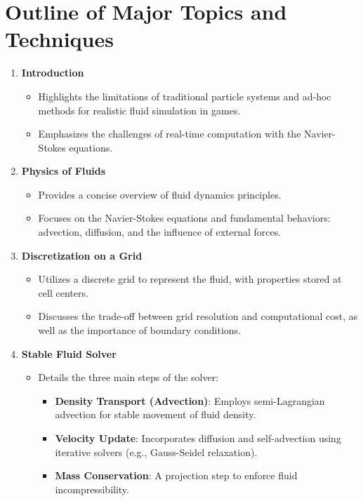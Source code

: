 \documentclass[12pt]{article}
\begin{document}
\section{Outline of Major Topics and Techniques}
\begin{enumerate}[noitemsep]
    \item \textbf{Introduction}
    \begin{itemize}[noitemsep]
        \item Highlights the limitations of traditional particle systems and ad-hoc methods for realistic fluid simulation in games.
        \item Emphasizes the challenges of real-time computation with the Navier-Stokes equations.
    \end{itemize}
    \item \textbf{Physics of Fluids}
    \begin{itemize}[noitemsep]
        \item Provides a concise overview of fluid dynamics principles.
        \item Focuses on the Navier-Stokes equations and fundamental behaviors: advection, diffusion, and the influence of external forces.
    \end{itemize}
    \item \textbf{Discretization on a Grid}
    \begin{itemize}[noitemsep]
        \item Utilizes a discrete grid to represent the fluid, with properties stored at cell centers.
        \item Discusses the trade-off between grid resolution and computational cost, as well as the importance of boundary conditions.
    \end{itemize}
    \item \textbf{Stable Fluid Solver}
    \begin{itemize}[noitemsep]
        \item Details the three main steps of the solver:
        \begin{itemize}[noitemsep]
            \item \textbf{Density Transport (Advection)}: Employs semi-Lagrangian advection for stable movement of fluid density.
            \item \textbf{Velocity Update}: Incorporates diffusion and self-advection using iterative solvers (e.g., Gauss-Seidel relaxation).
            \item \textbf{Mass Conservation}: A projection step to enforce fluid incompressibility.

\end{itemize}
\end{itemize}
\end{enumerate}
\end{document}
